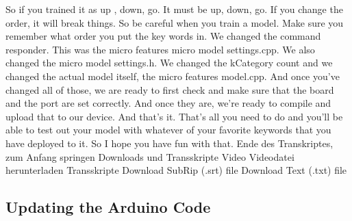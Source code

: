     So if you trained it as up , down, go.
    It must be up, down, go.
    If you change the order, it will break things.
    So be careful when you train a model.
    Make sure you remember what order you put the key words in.
    We changed the command responder.
    This was the micro features micro model settings.cpp.
    We also changed the micro model settings.h.
    We changed the kCategory count and we changed the actual model
    itself, the micro features model.cpp.
    And once you've changed all of those, we are
    ready to first check and make sure that the board and the port
    are set correctly.
    And once they are, we're ready to compile and upload that to our device.
    And that's it.
    That's all you need to do and you'll be able to test out
    your model with whatever of your favorite keywords
    that you have deployed to it.
    So I hope you have fun with that.
    Ende des Transkriptes, zum Anfang springen
    Downloads und Transskripte
    Video
    Videodatei herunterladen
    Transskripte
    Download SubRip (.srt) file
    Download Text (.txt) file
    
\subsection{Updating the Arduino Code}

